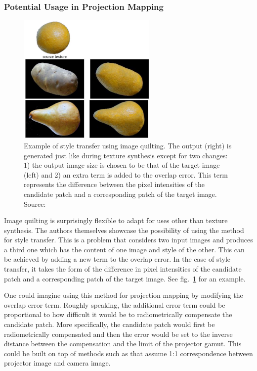 \subsubsection{Potential Usage in Projection Mapping}
\label{section:background-texture_synthesis-patch_based-projection_mapping}

\begin{figure}[t]
    \centering
    \includegraphics[width=0.6\textwidth]{images/02-quilting_transfer.jpg}
    \caption{Example of style transfer using image quilting. The output (right) is generated just like during texture synthesis except for two changes: 1) the output image size is chosen to be that of the target image (left) and 2) an extra term is added to the overlap error. This term represents the difference between the pixel intensities of the candidate patch and a corresponding patch of the target image. Source: \citet{Efros2001}}
    \label{fig:background_quilting_transfer}
\end{figure}

Image quilting is surprisingly flexible to adapt for uses other than texture synthesis. The authors themselves showcase the possibility of using the method for style transfer. This is a problem that considers two input images and produces a third one which has the content of one image and style of the other. This can be achieved by adding a new term to the overlap error. In the case of style transfer, it takes the form of the difference in pixel intensities of the candidate patch and a corresponding patch of the target image. See fig.~\ref{fig:background_quilting_transfer} for an example.

One could imagine using this method for projection mapping by modifying the overlap error term. Roughly speaking, the additional error term could be proportional to how difficult it would be to radiometrically compensate the candidate patch. More specifically, the candidate patch would first be radiometrically compensated and then the error would be set to the inverse distance between the compensation and the limit of the projector gamut. This could be built on top of methods such as \citet{Grundhofer2015} that assume 1:1 correspondence between projector image and camera image.


